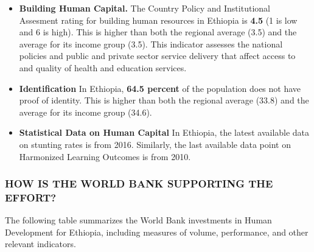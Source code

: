\documentclass[9.2pt,twocolumn]{article}
\begin{document}
\begin{itemize}
\item
  \textbf{Building Human Capital.} The Country Policy and Institutional
  Assesment rating for building human resources in Ethiopia is
  \textbf{4.5} (1 is low and 6 is high). This is higher than both the
  regional average (3.5) and the average for its income group (3.5).
  This indicator assesses the national policies and public and private
  sector service delivery that affect access to and quality of health
  and education services.
\item
  \textbf{Identification} In Ethiopia, \textbf{64.5 percent} of the
  population does not have proof of identity. This is higher than both
  the regional average (33.8) and the average for its income group
  (34.6).
\item
  \textbf{Statistical Data on Human Capital} In Ethiopia, the latest
  available data on stunting rates is from 2016. Similarly, the last
  available data point on Harmonized Learning Outcomes is from 2010.
\end{itemize}

\hypertarget{section-3}{%
\subsubsection{\texorpdfstring{\textcolor{bondiblue}{\textbf{H\small{OW IS THE WORLD BANK SUPPORTING THE EFFORT?}}}}{}}\label{section-3}}

The following table summarizes the World Bank investments in Human
Development for Ethiopia, including measures of volume, performance, and
other relevant indicators.
\end{document}
